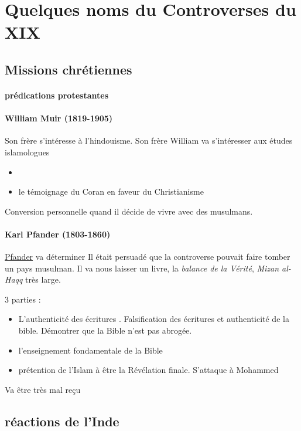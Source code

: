 \section{Quelques noms du Controverses du XIX }

\subsection{Missions chrétiennes}

\paragraph{prédications protestantes}

\paragraph{William Muir (1819-1905)}
Son frère s'intéresse à l'hindouisme. Son frère William va s'intéresser aux études islamologues
\begin{itemize}
    \item 
    \item le témoignage du Coran en faveur du Christianisme
\end{itemize}
Conversion personnelle quand il décide de vivre avec des musulmans.


\paragraph{Karl Pfander (1803-1860)} \href{https://en.wikipedia.org/wiki/Karl_Gottlieb_Pfander}{Pfander} va déterminer 
Il était persuadé que la controverse pouvait faire tomber un pays musulman.
Il va nous laisser un livre, la \textit{balance de la Vérité}, \textit{Mizan al-Haqq} très large. 

3 parties : 
\begin{itemize}
    \item L'authenticité des écritures . Falsification des écritures et authenticité de la bible. Démontrer que la Bible n'est pas abrogée. 
    
    \item l'enseignement fondamentale de la Bible
    \item prétention de l'Islam à être la Révélation finale. S'attaque à Mohammed
\end{itemize}

Va être très mal reçu

\subsection{réactions de l'Inde}

